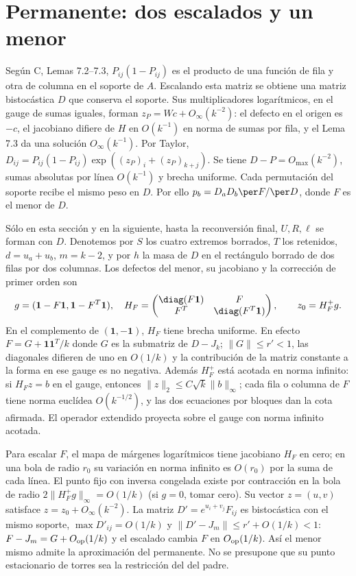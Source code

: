 \section{Permanente: dos escalados y un menor}
Según C, Lemas 7.2--7.3, $P_{ij}(1-P_{ij})$ es el producto de una función de fila
y otra de columna en el soporte de $A$. Escalando esta matriz se obtiene una matriz
bistocástica $D$ que conserva el soporte. Sus multiplicadores logarítmicos, en el gauge
de sumas iguales, forman $z_P=Wc+O_\infty(k^{-2})$: el defecto en el origen es $-c$,
el jacobiano difiere de $H$ en $O(k^{-1})$ en norma de sumas por fila,
y el Lema 7.3 da una solución $O_\infty(k^{-1})$. Por Taylor,
$D_{ij}=P_{ij}(1-P_{ij})\exp((z_P)_i+(z_P)_{k+j})$. Se tiene
$D-P=O_{\max}(k^{-2})$, sumas absolutas por línea $O(k^{-1})$ y brecha uniforme.
Cada permutación del soporte recibe el mismo peso en $D$. Por ello
$p_b=D_aD_b\per F/\per D$, donde $F$ es el menor de $D$.

Sólo en esta sección y en la siguiente, hasta la reconversión final, $U,R,\ell$
se forman con $D$. Denotemos por $S$ los cuatro extremos borrados, $T$ los
retenidos, $d=u_a+u_b$, $m=k-2$, y por $h$ la masa de $D$ en el rectángulo borrado
de dos filas por dos columnas. Los defectos del menor, su jacobiano y la corrección
de primer orden son
\[
 g=(\mathbf1-F\mathbf1,\mathbf1-F^T\mathbf1),\quad
 H_F=\begin{pmatrix}\diag(F\mathbf1)&F\\F^T&\diag(F^T\mathbf1)\end{pmatrix},
 \qquad z_0=H_F^+g .
\]
En el complemento de $(\mathbf1,-\mathbf1)$, $H_F$ tiene brecha uniforme.
En efecto $F=G+\mathbf1\mathbf1^T/k$ donde $G$ es la submatriz de $D-J_k$;
$\|G\|\le r'<1$, las diagonales difieren de uno en $O(1/k)$ y la contribución
de la matriz constante a la forma en ese gauge es no negativa. Además $H_F^+$
está acotada en norma infinito: si $H_F z=b$ en el gauge, entonces
$\|z\|_2\le C\sqrt{k}\|b\|_\infty$; cada fila o columna de $F$ tiene norma
euclídea $O(k^{-1/2})$, y las dos ecuaciones por bloques dan la cota afirmada.
El operador extendido proyecta sobre el gauge con norma infinito acotada.

Para escalar $F$, el mapa de márgenes logarítmicos tiene jacobiano $H_F$ en cero;
en una bola de radio $r_0$ su variación en norma infinito es $O(r_0)$ por la
suma de cada línea. El punto fijo con inversa congelada existe por contracción
en la bola de radio $2\|H_F^+g\|_\infty=O(1/k)$ (si $g=0$, tomar cero).
Su vector $z=(u,v)$ satisface $z=z_0+O_\infty(k^{-2})$. La matriz
$D'=e^{u_i+v_j}F_{ij}$ es bistocástica con el mismo soporte,
$\max D'_{ij}=O(1/k)$ y $\|D'-J_m\|\le r'+O(1/k)<1$:
$F-J_m=G+O_{\rm op}(1/k)$ y el escalado cambia $F$ en $O_{\rm op}(1/k)$.
Así el menor mismo admite la aproximación del permanente. No se presupone que
su punto estacionario de torres sea la restricción del del padre.

